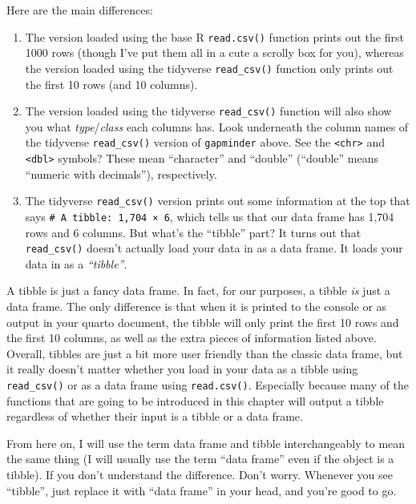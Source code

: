 \documentclass[
  letterpaper,
  DIV=11,
  numbers=noendperiod]{scrreprt}
\begin{document}
Here are the main differences:

\begin{enumerate}
\def\labelenumi{\arabic{enumi}.}
\item
  The version loaded using the base R \texttt{read.csv()} function
  prints out the first 1000 rows (though I've put them all in a cute a
  scrolly box for you), whereas the version loaded using the tidyverse
  \texttt{read\_csv()} function only prints out the first 10 rows (and
  10 columns).
\item
  The version loaded using the tidyverse \texttt{read\_csv()} function
  will also show you what \emph{type}/\emph{class} each columns has.
  Look underneath the column names of the tidyverse \texttt{read\_csv()}
  version of \texttt{gapminder} above. See the
  \texttt{\textless{}chr\textgreater{}} and
  \texttt{\textless{}dbl\textgreater{}} symbols? These mean
  ``character'' and ``double'' (``double'' means ``numeric with
  decimals''), respectively.
\item
  The tidyverse \texttt{read\_csv()} version prints out some information
  at the top that says \texttt{\#\ A\ tibble:\ 1,704\ ×\ 6}, which tells
  us that our data frame has 1,704 rows and 6 columns. But what's the
  ``tibble'' part? It turns out that \texttt{read\_csv()} doesn't
  actually load your data in as a data frame. It loads your data in as a
  \emph{``tibble''}.
\end{enumerate}

A tibble is just a fancy data frame. In fact, for our purposes, a tibble
\emph{is} just a data frame. The only difference is that when it is
printed to the console or as output in your quarto document, the tibble
will only print the first 10 rows and the first 10 columns, as well as
the extra pieces of information listed above. Overall, tibbles are just
a bit more user friendly than the classic data frame, but it really
doesn't matter whether you load in your data as a tibble using
\texttt{read\_csv()} or as a data frame using \texttt{read.csv()}.
Especially because many of the functions that are going to be introduced
in this chapter will output a tibble regardless of whether their input
is a tibble or a data frame.

From here on, I will use the term data frame and tibble interchangeably
to mean the same thing (I will usually use the term ``data frame'' even
if the object is a tibble). If you don't understand the difference.
Don't worry. Whenever you see ``tibble'', just replace it with ``data
frame'' in your head, and you're good to go.
\end{document}
